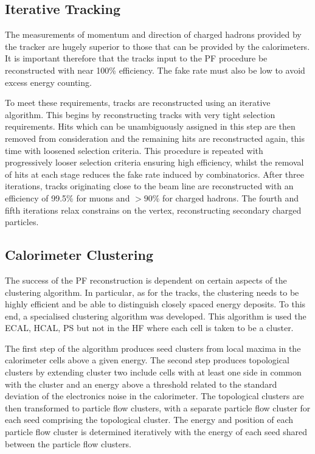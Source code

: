 \subsection{Iterative Tracking}
The measurements of momentum and direction of charged hadrons provided by the
tracker are hugely superior to those that can be provided by the calorimeters.
It is important therefore that the tracks input to the \ac{PF} procedure be
reconstructed with near 100\% efficiency. The fake rate must also be low to
avoid excess energy counting.

To meet these requirements, tracks are reconstructed using an iterative
algorithm. This begins by reconstructing tracks with very tight selection
requirements. Hits which can be unambiguously assigned in this step are then
removed from consideration and the remaining hits are reconstructed again, this
time with loosened selection criteria. This procedure is repeated with
progressively looser selection criteria ensuring high efficiency, whilst the
removal of hits at each stage reduces the fake rate induced by combinatorics.
After three iterations, tracks originating close to the beam line are
reconstructed with an efficiency of 99.5\% for muons and $>90\%$ for charged
hadrons. The fourth and fifth iterations relax constrains on the vertex,
reconstructing secondary charged particles.

\subsection{Calorimeter Clustering}
The success of the \ac{PF} reconstruction is dependent on certain aspects of the
clustering algorithm. In particular, as for the tracks, the clustering needs to
be highly efficient and be able to distinguish closely spaced energy deposits.
To this end, a specialised clustering algorithm was developed. This algorithm is
used the \ac{ECAL}, \ac{HCAL}, \ac{PS} but not in the \ac{HF} where each cell is
taken to be a cluster.

The first step of the algorithm produces seed clusters from local maxima in the
calorimeter cells above a given energy. The second step produces topological
clusters by extending cluster two include cells with at least one side in common
with the cluster and an energy above a threshold related to the standard
deviation of the electronics noise in the calorimeter. The topological clusters
are then transformed to particle flow clusters, with a separate particle flow
cluster for each seed comprising the topological cluster. The energy and
position of each particle flow cluster is determined iteratively with the energy
of each seed shared between the particle flow clusters.

